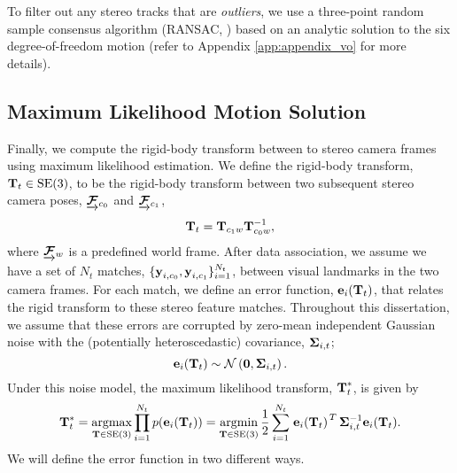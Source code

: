 To filter out any stereo tracks that are \textit{outliers}, we use a three-point random sample consensus algorithm (RANSAC, \cite{fischler1981random}) based on an analytic solution to the six degree-of-freedom motion \citep{Umeyama1991-ws} (refer to Appendix \ref{app:appendix_vo} for more details).
  
\subsection{Maximum Likelihood Motion Solution}
Finally, we compute the rigid-body transform between to stereo camera frames using maximum likelihood estimation. We define the rigid-body transform, $\boldsymbol{\mathbf{T}}_t \in\text{SE}(3)$, to be the rigid-body transform between two subsequent stereo camera poses, 
$\underrightarrow{ \boldsymbol{\mathbf{\mathcal{F}}} }_{c_0}$ and  $\underrightarrow{ \boldsymbol{\mathbf{\mathcal{F}}} }_{c_1}$, 
\begin{equation}
	\boldsymbol{\mathbf{T}}_t = \boldsymbol{\mathbf{T}}_{c_1w} \boldsymbol{\mathbf{T}}^{-1}_{c_0w},
\end{equation}
where $\underrightarrow{ \boldsymbol{\mathbf{\mathcal{F}}} }_{w}$ is a predefined world frame. After data association, we assume we have a set
of $N_t$ matches, $\{\boldsymbol{\mathbf{y}}_{i, c_0}, \boldsymbol{\mathbf{y}}_{i, c_1}\}_{i=1}^{N_t}$, between visual landmarks in the two camera frames. For each match, we define an error function, $\boldsymbol{\mathbf{e}}_{i}(\boldsymbol{\mathbf{T}}_t)$, that relates the rigid transform to these stereo feature matches. Throughout this dissertation, we assume that these errors are corrupted by zero-mean independent Gaussian noise with the (potentially heteroscedastic) covariance, $\boldsymbol{\mathbf{\Sigma}}_{i,t}$;
 \begin{equation}
  \boldsymbol{\mathbf{e}}_{i}(\boldsymbol{\mathbf{T}}_t) \sim
 \mathcal{N}\left(\boldsymbol{\mathbf{0}}, \boldsymbol{\mathbf{\Sigma}}_{i,t}\right). 
\end{equation}
Under this noise model, the maximum likelihood transform, $\boldsymbol{\mathbf{T}}^*_t$, is given by 
\begin{equation}
\label{eq:vo_objective}
  \boldsymbol{\mathbf{T}}_t^* = \operatorname*{argmax}_{\boldsymbol{\mathbf{T}}\in\text{SE}(3)}\prod_{i=1}^{N_t} p(\boldsymbol{\mathbf{e}}_{i}(\boldsymbol{\mathbf{T}}_t)) = \operatorname*{argmin}_{\boldsymbol{\mathbf{T}}\in\text{SE}(3)} \frac{1}{2} \sum_{i=1}^{N_t} 
  \left.{\boldsymbol{\mathbf{e}}_{i}(\boldsymbol{\mathbf{T}}_t)}\right.^T \boldsymbol{\mathbf{\Sigma}}_{i,t}^{-1} \boldsymbol{\mathbf{e}}_{i}(\boldsymbol{\mathbf{T}}_t).
\end{equation}
We will define the error function in two different ways.

